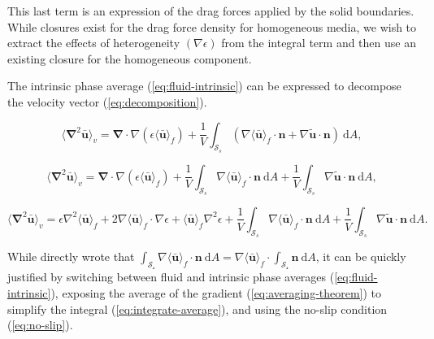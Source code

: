 \documentclass[a4paper,11pt]{article}
\begin{document}
This last term is an expression of the drag forces applied by the solid boundaries.
While closures exist for the drag force density for homogeneous media, we wish to extract the effects of heterogeneity $\left(\nabla\epsilon\right)$ from the integral term and then use an existing closure for the homogeneous component.

\bigskip

The intrinsic phase average (\autoref{eq:fluid-intrinsic}) can be expressed to decompose the velocity vector (\autoref{eq:decomposition}).

$$\langle\bm\nabla^2\bm{\bar u}\rangle_v = \bm\nabla\cdot\nabla\left(\epsilon\langle\bm{\bar u}\rangle_f\right) + \frac{1}{V}\int_{\mathcal S_s}\left(\nabla\langle \bm{\bar u}\rangle_f\cdot \bm n + \nabla\tilde{\bm u}\cdot \bm n\right)~\mathrm dA,$$

$$\langle\bm\nabla^2\bm{\bar u}\rangle_v = \bm\nabla\cdot\nabla\left(\epsilon\langle\bm{\bar u}\rangle_f\right) + \frac{1}{V}\int_{\mathcal S_s}\nabla\langle \bm{\bar u}\rangle_f\cdot \bm n~\mathrm dA + \frac{1}{V}\int_{\mathcal S_s}\nabla\tilde{\bm u}\cdot \bm n~\mathrm dA,$$

$$\langle\bm\nabla^2\bm{\bar u}\rangle_v = \epsilon\nabla^2\langle\bm{\bar u}\rangle_f + 2\nabla\langle\bm{\bar u}\rangle_f\cdot\nabla\epsilon + \langle\bm{\bar u}\rangle_f\nabla^2\epsilon + \frac{1}{V}\int_{\mathcal S_s}\nabla\langle \bm{\bar u}\rangle_f\cdot \bm n~\mathrm dA + \frac{1}{V}\int_{\mathcal S_s}\nabla\tilde{\bm u}\cdot \bm n~\mathrm dA.$$

While \citet{Rousseau2022} directly wrote that ${\int_\mathcal{S_s}\nabla\langle\bm{\bar u}\rangle_f\cdot\bm n~\mathrm dA=\nabla\langle\bm{\bar u}\rangle_f\cdot\int_\mathcal{S_s}\bm n~\mathrm dA}$, it can be quickly justified by switching between fluid and intrinsic phase averages (\autoref{eq:fluid-intrinsic}), exposing the average of the gradient (\autoref{eq:averaging-theorem}) to simplify the integral (\autoref{eq:integrate-average}), and using the no-slip condition (\autoref{eq:no-slip}).
\end{document}
